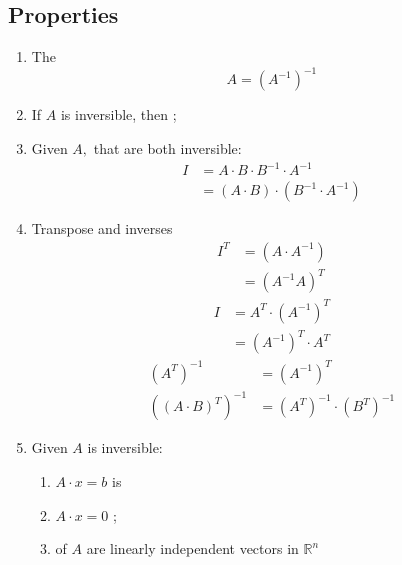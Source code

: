 \subsection{Properties}
  
  \begin{enumerate}
    \item The 
    \begin{displaymath}
      A = \left( A^{-1} \right)^{-1}
    \end{displaymath}
    
    \item If $ A $ is inversible, then ;
    \item Given $ A, $ that are both inversible:
    \begin{align*}
      I &= A \cdot B \cdot B^{-1} \cdot A^{-1} \\ 
      &= \left( A \cdot B \right) \cdot \left( B^{-1} \cdot A^{-1} \right)
    \end{align*}
    
    \item Transpose and inverses 
    \begin{align*}
      I^{T} &= \left( A \cdot A^{-1} \right) \\ 
      &= \left( A^{-1} A \right)^{T}
    \end{align*}
    \begin{align*}
      I &= A^{T} \cdot \left( A^{-1} \right)^{T} \\ 
      &= \left( A^{-1} \right)^{T} \cdot A^{T}
    \end{align*}
    \begin{align*}
      \left( A^{T} \right)^{-1} &= \left( A^{-1} \right)^{T} \\ 
      \left( \left( A \cdot B \right)^{T} \right)^{-1} &= 
      \left( A^{T} \right)^{-1} \cdot \left( B^{T} \right)^{-1}
    \end{align*}
    
    \item Given $ A $ is inversible:
    \begin{enumerate}
      \item $ A \cdot x = b $ is 
      
      \item $ A \cdot x = 0 $ ;
      
      \item {} of $ A $ are 
      linearly independent vectors in $ \mathbb{R}^{n} $
      

\end{enumerate}
\end{enumerate}
